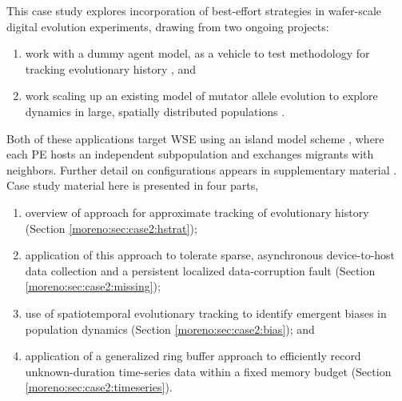 This case study explores incorporation of best-effort strategies in wafer-scale digital evolution experiments, drawing from two ongoing projects:
\begin{enumerate}
\item work with a dummy agent model, as a vehicle to test methodology for tracking evolutionary history \cite{singhvi2025scalable}, and
\item work scaling up an existing model of mutator allele evolution to explore dynamics in large, spatially distributed populations \cite{raynes2018sign,moreno2025hypermutatorsc}.
\end{enumerate}
Both of these applications target WSE using an island model scheme \cite{bennett1999building}, where each PE hosts an independent subpopulation and exchanges migrants with neighbors.
Further detail on configurations appears in supplementary material \cite{moreno_2026_trust}.
Case study material here is presented in four parts,
\begin{enumerate}
\item overview of approach for approximate tracking of evolutionary history (Section \ref{moreno:sec:case2:hstrat});
\item application of this approach to tolerate sparse, asynchronous device-to-host data collection and a persistent localized data-corruption fault (Section \ref{moreno:sec:case2:missing});
\item use of spatiotemporal evolutionary tracking to identify emergent biases in population dynamics (Section \ref{moreno:sec:case2:bias}); and
\item application of a generalized ring buffer approach to efficiently record unknown-duration time-series data within a fixed memory budget (Section \ref{moreno:sec:case2:timeseries}).
\end{enumerate}



